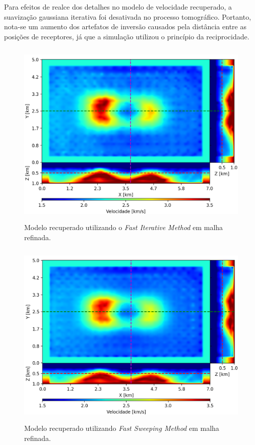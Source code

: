 Para efeitos de realce dos detalhes no modelo de velocidade recuperado, a suavização gaussiana iterativa foi desativada no processo tomográfico. Portanto, nota-se um aumento dos artefatos de inversão causados pela distância entre as posições de receptores, já que a simulação utilizou o princípio da reciprocidade.  

\begin{figure}[H]
	\centering
	\includegraphics[width=12cm,height=9cm]{Imgs/Resultados/fim_refined.png}
	\caption{Modelo recuperado utilizando o \textit{Fast Iterative Method} em malha refinada.}
	\label{fig:fim_refined}	
\end{figure}

\begin{figure}[H]
	\centering
	\includegraphics[width=12cm,height=9cm]{Imgs/Resultados/fsm_refined.png}
	\caption{Modelo recuperado utilizando \textit{Fast Sweeping Method} em malha refinada.}
	\label{fig:fsm_refined}	
\end{figure}
